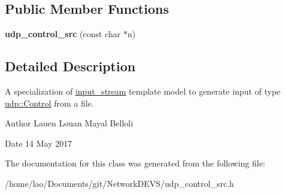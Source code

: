 \subsection*{Public Member Functions}
\begin{DoxyCompactItemize}
\item 
{\bfseries udp\+\_\+control\+\_\+src} (const char $\ast$n)\hypertarget{classudp__control__src_a40abd75549f525a16f006a54a9ffb87b}{}\label{classudp__control__src_a40abd75549f525a16f006a54a9ffb87b}

\end{DoxyCompactItemize}


\subsection{Detailed Description}
A specialization of \hyperlink{classinput__stream}{input\+\_\+stream} template model to generate input of type \hyperlink{structudp_1_1Control}{udp\+::\+Control} from a file. 

\begin{DoxyAuthor}{Author}
Lauen Louan Mayal Belloli 
\end{DoxyAuthor}
\begin{DoxyDate}{Date}
14 May 2017 
\end{DoxyDate}


The documentation for this class was generated from the following file\+:\begin{DoxyCompactItemize}
\item 
/home/lao/\+Documents/git/\+Network\+D\+E\+V\+S/udp\+\_\+control\+\_\+src.\+h\end{DoxyCompactItemize}

